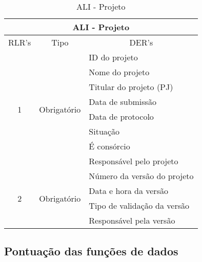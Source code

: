       \begin{table}[!h]
      \centering
      \caption{ALI - Projeto}
      \label{ali_projeto}
      \begin{tabular}{|c|c|l|}
      \hline
      \multicolumn{3}{|c|}{\textbf{ALI - Projeto}}                                                      \\ \hline
      \multicolumn{1}{|l|}{RLR's} & Tipo                         & \multicolumn{1}{c|}{DER's}  \\ \hline
      \multirow{8}{*}{1}          & \multirow{8}{*}{Obrigatório} & ID do projeto               \\ \cline{3-3} 
				  &                              & Nome do projeto             \\ \cline{3-3} 
				  &                              & Titular do projeto (PJ)     \\ \cline{3-3} 
				  &                              & Data de submissão           \\ \cline{3-3} 
				  &                              & Data de protocolo           \\ \cline{3-3} 
				  &                              & Situação                    \\ \cline{3-3} 
				  &                              & É consórcio                 \\ \cline{3-3} 
				  &                              & Responsável pelo projeto    \\ \hline
      \multirow{4}{*}{2}        & \multirow{4}{*}{Obrigatório} & Número da versão do projeto \\ \cline{3-3} 
				  &                              & Data e hora da versão       \\ \cline{3-3} 
				  &                              & Tipo de validação da versão \\ \cline{3-3} 
				  &                              & Responsável pela versão     \\ \hline
      \end{tabular}
      \end{table}

  \subsection{Pontuação das funções de dados}
  
